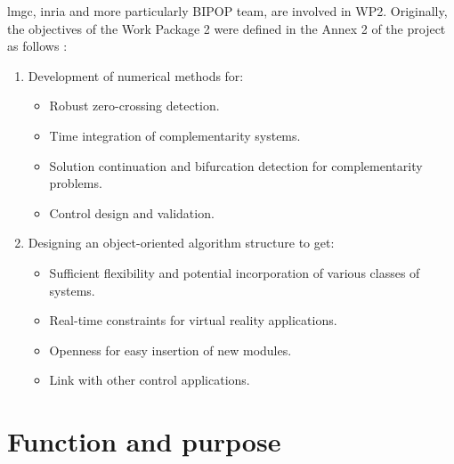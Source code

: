 \ac{lmgc}, \ac{inria} and more particularly BIPOP team, are involved in WP2. Originally, the objectives of the Work Package 2 were defined in the Annex 2 of the project as follows :
\begin{enumerate}
\item Development of numerical methods for:     
        \begin{itemize}
        \item Robust zero-crossing detection.
        \item Time integration of complementarity systems.
        \item Solution continuation and bifurcation detection for complementarity problems.
        \item Control design and validation.
        \end{itemize}
\item Designing an object-oriented algorithm structure to get:
        \begin{itemize}
        \item Sufficient flexibility and potential incorporation of various classes of systems.
        \item Real-time constraints for virtual reality applications.
        \item Openness for easy insertion of new modules.
        \item Link with other control applications.
        \end{itemize}
\end{enumerate}


\section{Function and purpose}

